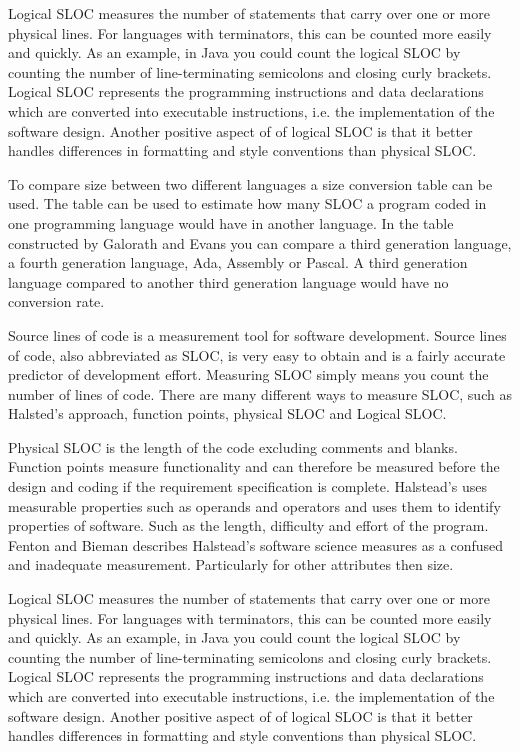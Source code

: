 Logical SLOC measures the number of statements that carry over one or more physical lines.  For languages with terminators, this can be counted more easily and quickly. As an example, in Java you could count the logical SLOC by counting the number of line-terminating semicolons and closing curly brackets. Logical SLOC represents the programming instructions and data declarations which are converted into executable instructions, i.e. the implementation of the software design. Another positive aspect of of logical SLOC is that it better handles differences in formatting and style conventions than physical SLOC\cite[p.~155]{galorath2006}.

To compare size between two different languages a size conversion table can be used. The table can be used to estimate how many SLOC a program coded in one programming language would have in another language. In the table constructed by Galorath and Evans you can compare a third generation language, a fourth generation language, Ada, Assembly or Pascal\cite[p.~163]{galorath2006}. A third generation language compared to another third generation language would have no conversion rate. 

Source lines of code is a measurement tool for software development. Source lines of code, also abbreviated as SLOC, is very easy to obtain and is a fairly accurate predictor of development effort\cite[p.~63]{galorath2006}. Measuring SLOC simply means you count the number of lines of code. There are many different ways to measure SLOC, such as Halsted’s approach, function points, physical SLOC and Logical SLOC. 

Physical SLOC is the length of the code excluding comments and blanks. Function points measure functionality and can therefore be measured before the design and coding if the requirement specification is complete\cite[p.~187]{galorath2006}. Halstead’s uses measurable properties such as operands and operators and uses them to identify properties of software. Such as the length, difficulty and effort of the program. Fenton and Bieman describes Halstead’s software science measures as a confused and inadequate measurement. Particularly for other attributes then size\cite[p.~345]{fenton2015}.

Logical SLOC measures the number of statements that carry over one or more physical lines.  For languages with terminators, this can be counted more easily and quickly. As an example, in Java you could count the logical SLOC by counting the number of line-terminating semicolons and closing curly brackets. Logical SLOC represents the programming instructions and data declarations which are converted into executable instructions, i.e. the implementation of the software design. Another positive aspect of of logical SLOC is that it better handles differences in formatting and style conventions than physical SLOC\cite[p.~155]{galorath2006}.

